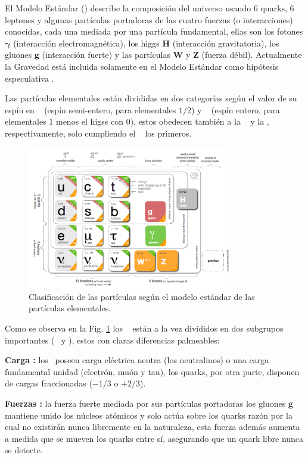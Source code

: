 El Modelo Estándar (\ME) describe la composición del universo usando 6 quarks, 6 leptones y algunas partículas portadoras de las cuatro  fuerzas (o interacciones) conocidas, cada una mediada por una partícula fundamental, ellas son los fotones $\mathbf{\gamma}$ (interacción electromagnética), los higgs $\mathbf{H}$ (interacción gravitatoria), los gluones $\mathbf{g}$ (interacción fuerte) y las partículas $\mathbf{W}$ y $\mathbf{Z}$ (fuerza débil). Actualmente la Gravedad está incluida solamente en el Modelo Estándar como hipótesis especulativa%
.

Las partículas elementales están divididas en dos categorías según el valor de su espín en \fermiones ~ (espín semi-entero, para elementales $1/2$) y \bosones ~ (espín entero, para elementales $1$ menos el higss con $0$), estos obedecen también a la \fermidirac ~ y la \boseeinstein, respectivamente, solo cumpliendo el \pauli ~ los primeros.

\begin{figure}
    \centering
    \includegraphics[width=0.8\textwidth]{Fisica_de_Particulas/imagenes/standard_model.png}
    \caption{Clasificación de las partículas según el modelo estándar de las partículas elementales.}
    \label{estandar}
\end{figure}

Como se observa en la Fig. \ref{estandar} los \fermiones ~ est\'an a la vez divididos en dos subgrupos importantes (\quarks ~ y \leptones), estos con claras diferencias palmeables:
\begin{itemize_f}
\item[-] \textbf{Carga :} los \leptones ~poseen carga eléctrica neutra (los neutralinos) o una carga fundamental unidad (electrón, muón y tau), los quarks, por otra parte, disponen de cargas fraccionadas ($- 1/3$ o $+ 2/3$). 
\item[-] \textbf{Fuerzas :} la fuerza fuerte mediada por sus partículas portadoras los gluones \textbf{g} mantiene unido los núcleos atómicos y solo act\'ua sobre los quarks raz\'on por la cual no existirán nunca libremente en la naturaleza, esta fuerza adem\'as aumenta a medida que se mueven los quarks entre sí, asegurando que un quark libre nunca se detecte. 
\end{itemize_f}

